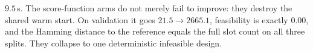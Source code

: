 $9.5$\,s.  The score-function arms do not merely fail to improve: they destroy the shared warm
start.  On validation it goes $21.5\to2665.1$, feasibility is exactly $0.00$, and the
Hamming distance to the reference equals the full slot count on all three splits.  They
collapse to one deterministic infeasible design.

